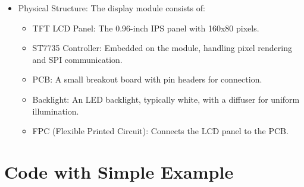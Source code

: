 \begin{itemize}

	\item Physical Structure: The display module consists of:

	\begin{itemize}

		\item TFT LCD Panel: The 0.96-inch IPS panel with 160x80 pixels.

		\item ST7735 Controller: Embedded on the module, handling pixel rendering and SPI communication.

		\item PCB: A small breakout board with pin headers for connection.

		\item Backlight: An LED backlight, typically white, with a diffuser for uniform illumination.

		\item FPC (Flexible Printed Circuit): Connects the LCD panel to the PCB.

	\end{itemize}

\end{itemize}



\section{Code with Simple Example}

\begin{code}[h!]
	\label{LCD:example}
\end{code}
